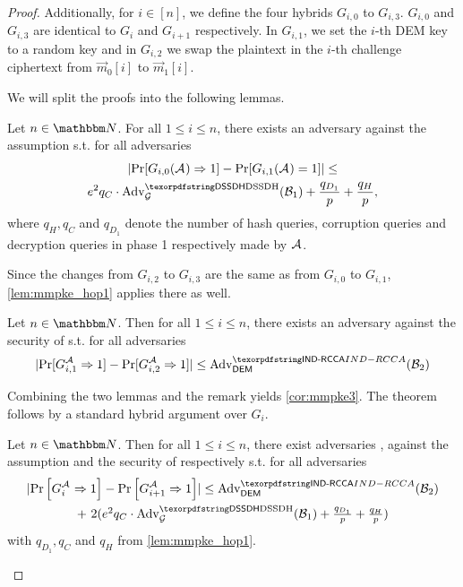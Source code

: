 \begin{proof}
  Additionally, for $i\in[n]$, we define the four hybrids $G_{i,0}$ to $G_{i,3}$. $G_{i,0}$ and $G_{i,3}$ are identical
  to $G_i$ and $G_{i+1}$ respectively. In $G_{i,1}$, we set the $i$-th DEM key to a random key and in $G_{i,2}$ we swap
  the plaintext in the $i$-th challenge ciphertext from $\vec{m}_0[i]$ to $\vec{m}_1[i]$.

  We will split the proofs into the following lemmas.
  \begin{lemma}\label{lem:mmpke_hop1}
    Let $n\in\N$. For all $1\leq i \le n$, there exists an adversary \Bdv[1] against the \sdh assumption s.t. for all adversaries \Adv
    \begin{multline*}
      \abs{\Pr[G_{i,0}(\Adv)\Rightarrow 1]- \Pr[G_{i,1}({\Adv}) = 1]} \leq \\
      e^2q_C\cdot\adv{\sdh}{\Group}({\Bdv[1]}) + \frac{q_{D_1}}{p} + \frac{q_H}{p},
    \end{multline*}
    where $q_H, q_C$ and $q_{D_1}$ denote the number of hash queries, corruption queries and decryption queries in phase
    1 respectively made by $\mathcal{A}_{\relax}$.
  \end{lemma}
  \begin{remark}
    Since the changes from $G_{i,2}$ to $G_{i,3}$ are the same as from $G_{i,0}$ to $G_{i,1}$, \cref{lem:mmpke_hop1} applies there as
    well.
  \end{remark}

  \begin{lemma}\label{lem:mmpke_hop2}
    Let $n\in\N$. Then for all $1\leq i \le n$, there exists an adversary \Bdv[2] against the \indrcca security of \dem s.t. for all adversaries \Adv
    \[
      \abs{\Pr[G_{i,1}^{\Adv}\Rightarrow 1]-\Pr[G_{i,2}^{\Adv}\Rightarrow 1]} \leq \adv{\indrcca}{\dem}({\Bdv[2]})
    \]
  \end{lemma}

  Combining the two lemmas and the remark yields \cref{cor:mmpke3}. The theorem follows by a standard hybrid
  argument over $G_i$.

  \begin{corollary}\label{cor:mmpke3}
    Let $n\in\N$. Then for all $1\leq i \le n$, there exist adversaries \Bdv[1], \Bdv[2] against the \sdh assumption and
    the \indrcca security of \dem respectively s.t. for all adversaries \Adv
    \begin{multline*}
      \abs{\Pr\left[G_i^{\Adv}\Rightarrow 1\right] - \Pr\left[G_{i+1}^{\Adv}\Rightarrow 1\right]} \leq  \adv{\indrcca}{\dem}({\Bdv[2]}) \\
      \begin{array}{c}
        +\ 2(e^2q_C\cdot\adv{\sdh}{\Group}({\Bdv[1]}) + \frac{q_{D_1}}{p} + \frac{q_H}{p}) \\
      \end{array}
    \end{multline*}
    with $q_{D_1}, q_C$ and $q_H$ from \cref{lem:mmpke_hop1}.
  \end{corollary}


\end{proof}
